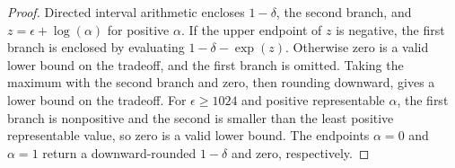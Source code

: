 \documentclass{article}
\begin{document}
\begin{proof}
Directed interval arithmetic encloses $1-\delta$, the second branch, and
$z=\epsilon+\log(\alpha)$ for positive $\alpha$. If the upper endpoint of
$z$ is negative, the first branch is enclosed by evaluating
$1-\delta-\exp(z)$. Otherwise zero is a valid lower bound on the tradeoff,
and the first branch is omitted. Taking the maximum with the second branch
and zero, then rounding downward, gives a lower bound on the tradeoff.
For $\epsilon\ge1024$ and positive representable $\alpha$, the first branch
is nonpositive and the second is smaller than the least positive
representable value, so zero is a valid lower bound. The endpoints
$\alpha=0$ and $\alpha=1$ return a downward-rounded $1-\delta$ and zero,
respectively.
\end{proof}
\end{document}

